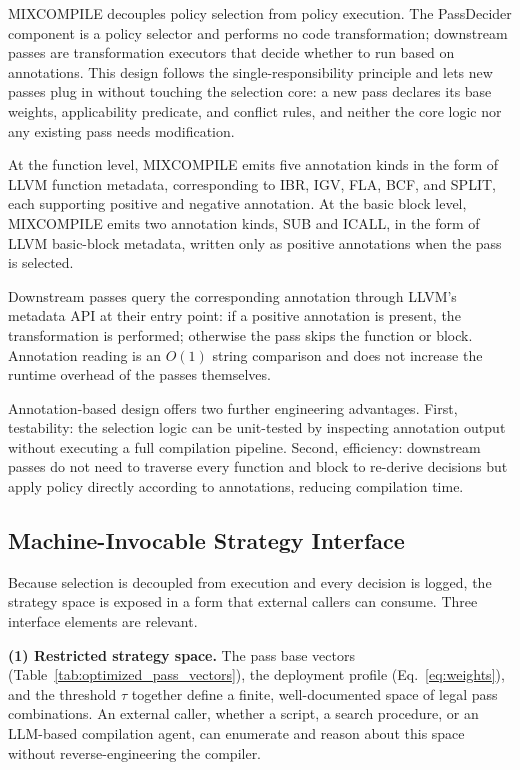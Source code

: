 \documentclass[5p,times,authoryear]{elsarticle}
\theoremstyle{plain}
\theoremstyle{definition}
\theoremstyle{remark}
\begin{document}
MIXCOMPILE decouples policy selection from policy execution. The PassDecider component
is a policy selector and performs no code transformation; downstream passes are
transformation executors that decide whether to run based on annotations. This design
follows the single-responsibility principle and lets new passes plug in without
touching the selection core: a new pass declares its base weights, applicability
predicate, and conflict rules, and neither the core logic nor any existing pass needs
modification.

At the function level, MIXCOMPILE emits five annotation kinds in the form of LLVM
function metadata, corresponding to IBR, IGV, FLA, BCF, and SPLIT, each supporting
positive and negative annotation. At the basic block level, MIXCOMPILE emits two
annotation kinds, SUB and ICALL, in the form of LLVM basic-block metadata, written only
as positive annotations when the pass is selected.

Downstream passes query the corresponding annotation through LLVM's metadata API at
their entry point: if a positive annotation is present, the transformation is
performed; otherwise the pass skips the function or block. Annotation reading is an
$O(1)$ string comparison and does not increase the runtime overhead of the passes
themselves.

Annotation-based design offers two further engineering advantages. First,
testability: the selection logic can be unit-tested by inspecting annotation
output without executing a full compilation pipeline. Second, efficiency:
downstream passes do not need to traverse every function and block to re-derive
decisions but apply policy directly according to annotations, reducing
compilation time.

\subsection{Machine-Invocable Strategy Interface}
\label{sec:interface}

Because selection is decoupled from execution and every decision is logged, the
strategy space is exposed in a form that external callers can consume. Three interface
elements are relevant.

\textbf{(1) Restricted strategy space.} The pass base vectors
(Table~\ref{tab:optimized_pass_vectors}), the deployment profile
(Eq.~\eqref{eq:weights}), and the threshold $\tau$ together define a finite,
well-documented space of legal pass combinations. An external caller, whether a
script, a search procedure, or an LLM-based compilation agent, can enumerate and
reason about this space without reverse-engineering the compiler.
\end{document}
